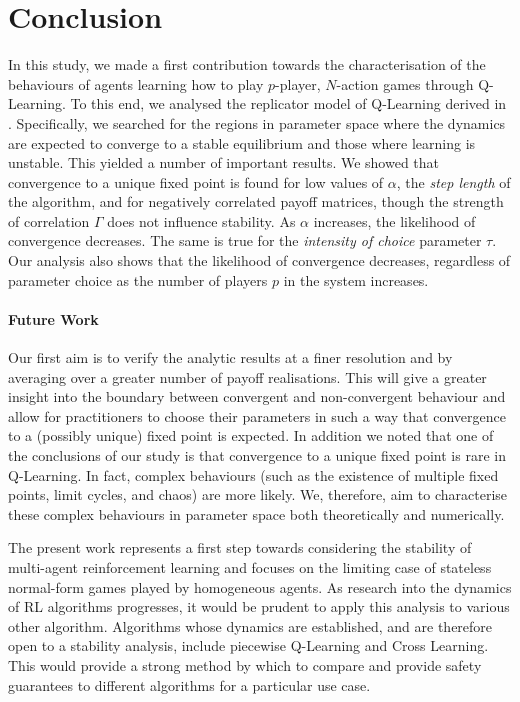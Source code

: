 \documentclass[sigconf,anonymous]{aamas}
\begin{document}
\section{Conclusion}

In this study, we made a first contribution towards the
characterisation of the behaviours of agents learning how to play
$p$-player, $N$-action games through Q-Learning. To this end, we
analysed the replicator model of Q-Learning derived in \cite{Tuyls2006AnGames}. Specifically, we searched for the regions in parameter space
where the dynamics are expected to converge to a stable equilibrium
and those where learning is unstable. This yielded a number of
important results. We showed that convergence to a unique fixed point is
found for low values of $\alpha$, the \textit{step length} of the
algorithm, and for negatively correlated payoff matrices, though the
strength of correlation $\Gamma$ does not influence stability. As
$\alpha$ increases, the likelihood of convergence decreases. The same
is true for the \textit{intensity of choice} parameter $\tau$. Our
analysis also shows that the likelihood of convergence decreases,
regardless of parameter choice as the number of players $p$ in the
system increases.

\paragraph{Future Work}
Our first aim is to verify the analytic results at a finer resolution
and by averaging over a greater number of payoff realisations. This
will give a greater insight into the boundary between convergent and
non-convergent behaviour and allow for practitioners to choose their
parameters in such a way that convergence to a (possibly unique) fixed
point is expected. In addition we noted that one of the conclusions of
our study is that convergence to a unique fixed point is rare in
Q-Learning. In fact, complex behaviours (such as the existence of
multiple fixed points, limit cycles, and chaos) are more likely. We,
therefore, aim to characterise these complex behaviours in parameter
space both theoretically and numerically.

The present work represents a first step towards considering the stability
of multi-agent reinforcement learning and focuses on the limiting case
of stateless normal-form games played by homogeneous agents. As
research into the dynamics of RL algorithms
progresses, it would be prudent to apply this analysis to various
other algorithm. Algorithms whose dynamics are established, and are
therefore open to a stability analysis, include piecewise Q-Learning
and Cross Learning. This would provide a strong method by which to
compare and provide safety guarantees to different algorithms for a
particular use case.
\end{document}
